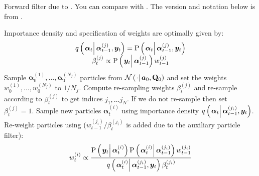 \documentclass[9pt, notitlepage]{article}
\newcommand\StateX{\Statex\hspace{\algorithmicindent}}
\renewcommand{\vec}[1]{\bm{#1}}
\newcommand{\mat}[1]{\mathbf{#1}}
\newcommand{\Lparen}[1]{\left( #1\right)}
\newcommand{\Cond}[2]{\left. #1 \vphantom{#2} \right\vert  #2}
\newcommand{\Prob}{\text{P}}
\newcommand{\optor}[2]{#1\Lparen{#2}}
\newcommand{\optorC}[3]{\optor{#1}{\Cond{#2}{#3}}}
\newcommand{\propC}[2]{\optorC{\Prob}{#1}{#2}}
\newcommand{\normalC}[3]{\optorC{\mathcal{N}}{#1}{#2,#3}}
\newcommand{\IDC}[2]{\optorC{q}{#1}{#2}}
\newcommand{\partic}[3]{#1_{#2}^{\Lparen{#3}}}
\newcommand{\nPart}{N}
\newcommand{\nPeriods}{d}
\begin{document}
\begin{algorithm}[H]
\caption{Forward filter due to \cite{pitt99}. You can compare with \citet[page 20 and 25]{doucet09}. The version and notation below is from \citet[page 449]{fearnhead10}.}\label{alg:forward}
\begin{algorithmic}[1]\raggedright
\INPUT
\Statex Importance density and specification of weights are optimally given by:
\Statex \begin{equation}\begin{matrix}
	\IDC{\vec{\alpha}_t}{\partic{\vec{\alpha}}{t-1}{j}, \vec{y}_t} = \propC{\vec{\alpha}_t}{\partic{\vec{\alpha}}{t-1}{j}, \vec{y}_t} \\
	\partic{\beta}{t}{j} \propto \propC{\vec{y}_t}{\partic{\vec{\alpha}}{t-1}{j}}\partic{w}{t-1}{j}
\end{matrix}\end{equation}
%
\State Sample $\partic{\vec{\alpha}}{0}{1},\dots,\partic{\vec{\alpha}}{0}{\nPart_f}$ particles from $\normalC{\cdot}{\vec{a}_0}{\mat{Q}_0}$ and set the weights $\partic{w}{0}{1},\dots,\partic{w}{0}{\nPart_f}$ to $1 / \nPart_f$.
%
\For{$t=1,\dots, \nPeriods$}
\State Compute re-sampling weights $\partic{\beta}{t}{j}$ and re-sample according to $\partic{\beta}{t}{j}$ to get indices $j_1,\dots j_\nPart$. If we do not re-sample then set $\partic{\beta}{t}{j} = 1$.
\EndProcedure
%
\State Sample new particles $\partic{\vec{\alpha}}{t}{i}$ using importance density $\IDC{\vec{\alpha}_t}{\partic{\vec{\alpha}}{t-1}{j_i}, \vec{y}_t}$.
\EndProcedure
%
\State Re-weight particles using ($\partic{w}{t-1}{j_i}/\partic{\beta}{t}{j_i}$ is added due to the auxiliary particle filter):
\StateX \begin{equation}\label{eqn:forwardWeight}
	\partic{w}{t}{i} \propto \frac{
		\propC{\vec{y}_t}{\partic{\vec{\alpha}}{t}{i}}
		\propC{\partic{\vec{\alpha}}{t}{i}}{\partic{\vec{\alpha}}{t-1}{j_i}}
		\partic{w}{t-1}{j_i}
	}{ %
		\IDC{\partic{\vec{\alpha}}{t}{i}}{\partic{\vec{\alpha}}{t-1}{j_i}, \vec{y}_t}
		\partic{\beta}{t}{j_i}
	}
\end{equation}
\EndProcedure
\EndFor
\end{algorithmic}
\end{algorithm}
\end{document}
